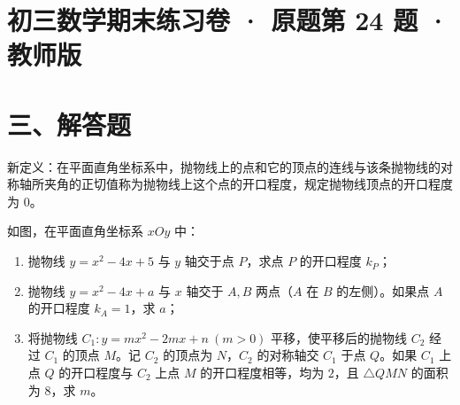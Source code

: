 \documentclass{exam-zh}
\begin{document}
\section*{初三数学期末练习卷 · 原题第 24 题 · 教师版}

\section*{三、解答题}


\begin{problem}[points=12]
  \noindent
  \begin{minipage}[t]{\dimexpr\linewidth-62mm-6mm\relax}
    \vspace{0pt}
    新定义：在平面直角坐标系中，抛物线上的点和它的顶点的连线与该条抛物线的对称轴所夹角的正切值称为抛物线上这个点的开口程度，规定抛物线顶点的开口程度为 $0$。

如图，在平面直角坐标系 $xOy$ 中：
\begin{enumerate}
\item 抛物线 $y=x^2-4x+5$ 与 $y$ 轴交于点 $P$，求点 $P$ 的开口程度 $k_P$；
\item 抛物线 $y=x^2-4x+a$ 与 $x$ 轴交于 $A,B$ 两点（$A$ 在 $B$ 的左侧）。如果点 $A$ 的开口程度 $k_A=1$，求 $a$；
\item 将抛物线 $C_1:y=mx^2-2mx+n\ (m>0)$ 平移，使平移后的抛物线 $C_2$ 经过 $C_1$ 的顶点 $M$。记 $C_2$ 的顶点为 $N$，$C_2$ 的对称轴交 $C_1$ 于点 $Q$。如果 $C_1$ 上点 $Q$ 的开口程度与 $C_2$ 上点 $M$ 的开口程度相等，均为 $2$，且 $\triangle QMN$ 的面积为 $8$，求 $m$。
\end{enumerate}
    

\end{minipage}
\end{problem}
\end{document}
